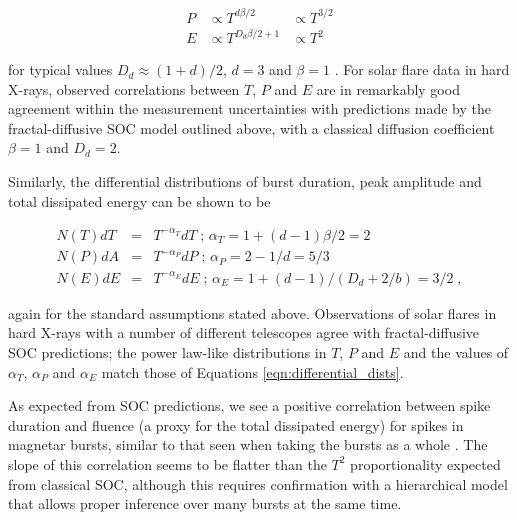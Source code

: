 \documentclass[12pt]{emulateapj}
\begin{document}
\begin{eqnarray}
P & \propto  T^{d\beta/2} &\propto  T^{3/2} \\ 
E &\propto   T^{D_d\beta/2 + 1} & \propto  T^{2} 
\end{eqnarray}

for typical values $D_d \approx (1+d)/2$, $d = 3$  and  $\beta = 1$ \citep[see ][ and references therein for details of the derivation]{aschwanden2014}. 
For solar flare data in hard X-rays, observed correlations between $T$, $P$ and $E$ are in remarkably good agreement within the measurement
uncertainties with predictions made by the fractal-diffusive SOC model outlined above, with a classical diffusion coefficient $\beta = 1$ and $D_d = 2$.

Similarly, the differential distributions of burst duration, peak amplitude and total dissipated energy can be shown to be

\begin{eqnarray}
\label{eqn:differential_dists}
N(T) dT &=& T^{-\alpha_T}dT \;  \mbox{; $\alpha_T = 1 + (d-1)\beta/2$} = 2\nonumber \\ 
N(P) dA &=& T^{-\alpha_P}dP \; \mbox{; $\alpha_P = 2 - 1/d$} = 5/3 \\
N(E) dE & = &T^{-\alpha_E}dE  \;\mbox{; $\alpha_E = 1 + (d-1)/(D_d + 2/b)$} =  3/2 \; ,  \nonumber
\end{eqnarray}

again for the standard assumptions stated above. Observations of solar flares in hard X-rays with a number of different telescopes
agree with fractal-diffusive SOC predictions; the power law-like distributions in $T$, $P$ and $E$ and the values of $\alpha_T$, $\alpha_P$
and $\alpha_E$ match those of Equations \ref{eqn:differential_dists}.

As expected from SOC predictions, we see a positive correlation between spike duration and 
fluence (a proxy for the total dissipated energy) for spikes in magnetar bursts, similar to that seen when taking the bursts as a whole \citep{gogus1999}. 
The slope of this correlation seems to be flatter than the $T^{2}$ proportionality
expected from classical SOC, although this requires confirmation with a hierarchical model that allows proper inference over many
bursts at the same time.  
\end{document}
